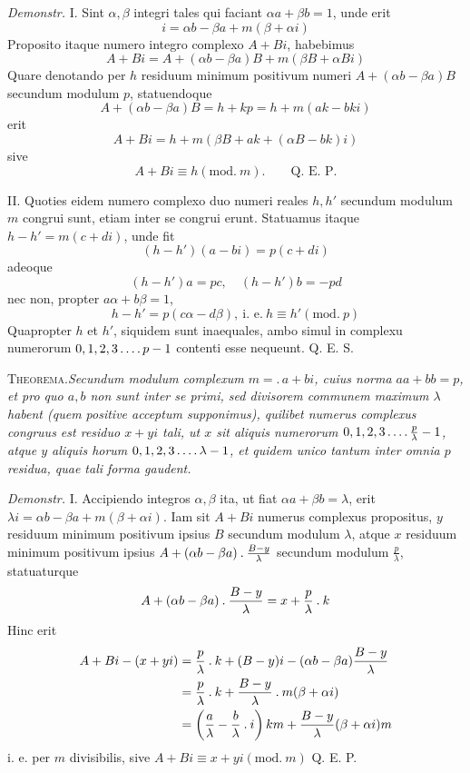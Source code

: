 %
\emph{Demonstr.} I. Sint $\alpha,\beta$ integri tales qui faciant $\alpha a+\beta b=1$, unde erit
\[
i=\alpha b-\beta a+m(\beta+\alpha i)
\]
Proposito itaque numero integro complexo $A+Bi$, habebimus
\[
A+Bi=A+(\alpha b-\beta a)B+m(\beta B+\alpha Bi)
\]
Quare denotando per $h$ residuum minimum positivum numeri $A+(\alpha b-\beta a)B$ secundum modulum $p$, statuendoque
\[
A+(\alpha b-\beta a)B=h+kp=h+m(ak-bki)
\]
erit
\[
A+Bi=h+m(\beta B+ak+(\alpha B-bk)i)
\]
sive
\[
A+Bi\equiv h(\mathrm{mod.}\ m).\qquad\text{Q. E. P.}
\]

II. Quoties eidem numero complexo duo numeri reales $h,h'$ secundum modulum $m$ congrui sunt, etiam inter se congrui erunt. Statuamus itaque $h-h'=m(c+di)$, unde fit
\[
(h-h')(a-bi)=p(c+di)
\]
adeoque
\[
(h-h')a=pc,\quad(h-h')b=-pd
\]
nec non, propter $a\alpha+b\beta=1$,
\[
h-h'=p(c\alpha-d\beta),\ \text{i. e.}\ h\equiv h'(\mathrm{mod.}\ p)
\]
Quapropter $h$ et $h'$, siquidem sunt inaequales, ambo simul in complexu numerorum $0,1,2,3\mathinner{.\,.\,.\,.} p-1$ contenti esse nequeunt. Q. E. S.

\textsc{Theorema.}\quad\emph{Secundum modulum complexum $m=.\,a+bi$, cuius norma $aa+bb=p$, et pro quo $a,b$ non sunt inter se primi, sed divisorem communem maximum $\lambda$ habent (quem positive acceptum supponimus), quilibet numerus complexus congruus est residuo $x+yi$ tali, ut $x$ sit aliquis numerorum $0,1,2,3\mathinner{.\,.\,.\,.}\frac p\lambda-1$, atque $y$ aliquis horum $0,1,2,3\mathinner{.\,.\,.\,.}\lambda-1$, et quidem unico tantum inter omnia $p$ residua, quae tali forma gaudent.}

%
\emph{Demonstr.} I. Accipiendo integros $\alpha,\beta$ ita, ut fiat $\alpha a+\beta b=\lambda$, erit $\lambda i=\alpha b-\beta a+m(\beta+\alpha i)$. Iam sit $A+Bi$ numerus complexus propositus, $y$ residuum minimum positivum ipsius $B$ secundum modulum $\lambda$, atque $x$ residuum minimum positivum ipsius $A+(\alpha b-\beta a)\mathbin{.}\frac{B-y}{\lambda}$ secundum modulum $\frac p\lambda$, statuaturque
\[
A+(\alpha b-\beta a)\mathbin{.}\frac{B-y}{\lambda}=x+\frac p\lambda\mathbin{.} k
\]
Hinc erit
\[
\begin{aligned}
A+Bi-(x+yi)&=\frac p\lambda\mathbin{.} k+(B-y)i-(\alpha b-\beta a)\frac{B-y}{\lambda}\\
&=\frac p\lambda\mathbin{.} k+\frac{B-y}{\lambda}\mathbin{.} m(\beta+\alpha i)\\
&=\left(\frac a\lambda-\frac b\lambda\mathbin{.} i\right)km+\frac{B-y}{\lambda}(\beta+\alpha i)m
\end{aligned}
\]
i. e. per $m$ divisibilis, sive $A+Bi\equiv x+yi(\mathrm{mod.}\ m)$ Q. E. P.


